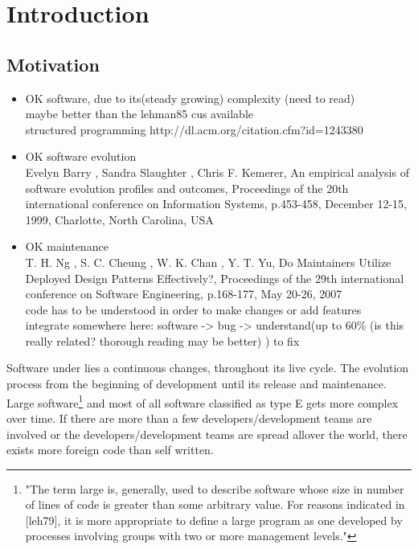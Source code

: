 

\chapter{Introduction}

\section{Motivation}

\begin{itemize}

\item OK software, due to its(steady growing) complexity \cite{Lehman:1985:PEP:7261}(need to read) \\ maybe better than the lehman85 cus available \cite{Lehman:2003:SEB:950401.950407} \\ structured programming http://dl.acm.org/citation.cfm?id=1243380
	
\item OK software evolution \\
	Evelyn Barry , Sandra Slaughter , Chris F. Kemerer, An empirical analysis of software evolution profiles and outcomes, Proceedings of the 20th international conference on Information Systems, p.453-458, December 12-15, 1999, Charlotte, North Carolina, USA

\item OK maintenance \cite{Lientz:1980:SMM:601062} \cite{ISOSWMaintainance} \\
	T. H. Ng , S. C. Cheung , W. K. Chan , Y. T. Yu, Do Maintainers Utilize Deployed Design Patterns Effectively?, Proceedings of the 29th international conference on Software Engineering, p.168-177, May 20-26, 2007 \\
	code has to be understood \cite{Boehm:1976:SE:1311958.1312684} in order to make changes or add features \cite{Singer97anexamination} \\
	integrate somewhere here: software -> bug -> understand(up to 60\% \cite{Basili:1997:EPR:257260.257262}(is this really related? thorough reading may be better) \cite{Pigoski:1996:PSM:524398} ) to fix
\end{itemize}

Software under lies a continuous changes, throughout its live cycle.
The evolution process from the beginning of development until its release and maintenance. Large software\footnote{"The term large is, generally, used to describe software whose size in number of lines of code is greater than some arbitrary value. For reasons indicated in [leh79], it is more appropriate to define a large program as one developed by processes involving groups with two or more management levels."\cite{Lehman:2003:SEB:950401.950407}} and most of all software  classified as type E \cite{Cook:2006:ESS:1115566.1115567} gets more complex over time. If there are more than a few developers/development teams are involved or the developers/development teams are spread allover the world, there exists more foreign code than self written.


